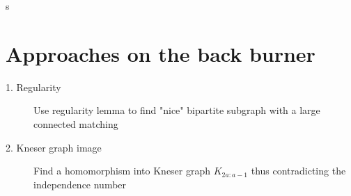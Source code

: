 



s











\section{Approaches on the back burner}

\begin{description}
	\item[1. Regularity] Use regularity lemma to find "nice" bipartite subgraph with a large connected matching
	\item[2. Kneser graph image] Find a homomorphism into Kneser graph $K_{2a:a-1}$ thus contradicting the independence number 
\end{description}

%


